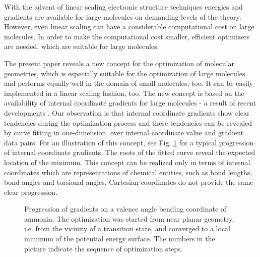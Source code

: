 \documentclass[prl,aps,twocolumn,showpacs,twocolumngrid,superbib]{revtex4}
\begin{document}
With the advent of linear scaling electronic structure techniques 
\cite{Goedecker99}
energies and gradients are available for large molecules on demanding
levels of the theory. However, even linear scaling can have 
a considerable computational cost on large molecules. In order to
make the computational cost smaller, efficient optimizers are
needed, which are suitable for large molecules.

The present paper reveals a new concept for the optimization of
molecular geometries, which is especially suitable for the
optimization of large molecules and performs equally well in the
domain of small molecules, too. It can be easily implemented
in a linear scaling fashion, too.
The new concept is based on the availability of internal coordinate
gradients for large molecules - a result of recent developments
\cite{paizs_coordtrf1,nemeth_coordtrf1,paizs_coordtrf2,nemeth_coordtrf2,billeter_coordtrf,andzelm_coordtrf,kudin_coordtrf}.
Our observation is that internal coordinate gradients show clear
tendencies during the optimization process and these tendencies can be revealed
by curve fitting in one-dimension, over internal coordinate value and gradient
data pairs. For an illustration of this concept,
see Fig. \ref{NH3outp6} for a typical progression of internal coordinate
gradients. The roots of the fitted curve reveal the expected location
of the minimum. This concept can be realized only in terms of
internal coordinates which are representations of chemical entities, such as
bond lengths, bond angles and torsional angles. Cartesian
coordinates do not provide the same clear progression.
\begin{figure}[h]
\caption{
\small  
Progression of gradients on a valence angle bending coordinate of
ammonia. The optimization was started from near planar geometry, i.e.
from the vicinity of a transition state, and converged to a local 
minimum of the potential energy surface. The numbers in the picture
indicate the sequence of optimization steps.
\label{NH3outp6}
}
\end{figure}
\end{document}
